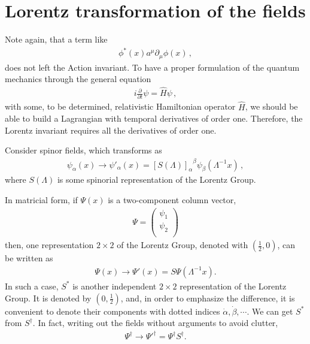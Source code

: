 \section{Lorentz transformation of the fields}

Note again, that a term like
\begin{align}
\label{eq:nolor}
  \phi^*(x)a^\mu\partial_\mu\phi(x)\,,
\end{align}
does not left the Action invariant. To have a proper formulation of the quantum mechanics through the general equation
\begin{align}
  i\frac{\partial}{\partial t}\psi=\hat{H} \psi\,,  
\end{align}
with some, to be determined, relativistic Hamiltonian operator $\widehat{H}$, we should be able to build a Lagrangian with temporal derivatives of order one. Therefore, the Lorentz invariant requires all the derivatives of order one.  
\begin{frame}
Consider spinor fields, which transforms as
\begin{align}
\label{eq:184qft}
  \psi_\alpha(x)\to\psi'_\alpha(x)={\left[ S(\Lambda) \right]_\alpha}^\beta\psi_\beta(\Lambda^{-1}x)\,, 
\end{align}
where $S(\Lambda)$ is some spinorial representation of the Lorentz Group. 
\end{frame}
In matricial form, if $\Psi(x)$ is a two-component column vector, 
\begin{align*}
  \Psi=
  \begin{pmatrix}
   \psi_1\\
   \psi_2\\
  \end{pmatrix}
\end{align*}
then, one representation $2\times2$ of the Lorentz Group, denoted with $(\frac{1}{2},0)$, can be written as
\begin{align}
  \Psi(x)\to \Psi'(x)=S\Psi \left(\Lambda^{-1}x  \right).
\end{align}
In such a case, $S^{*}$ is another independent $2\times2$ representation of the Lorentz Group. It is denoted by $\left( 0,\frac{1}{2}\right)$, and, in order to emphasize the difference, it is convenient to denote their components with dotted indices $\dot{\alpha},\dot{\beta},\cdots$. We can get $S^{*}$ from $S^{\dagger}$. In fact, writing out the fields without arguments to avoid clutter, 
\begin{align}
    \Psi^{\dagger}\to \Psi'^{\dagger}=\Psi^{\dagger}S^{\dagger}.
\end{align}
